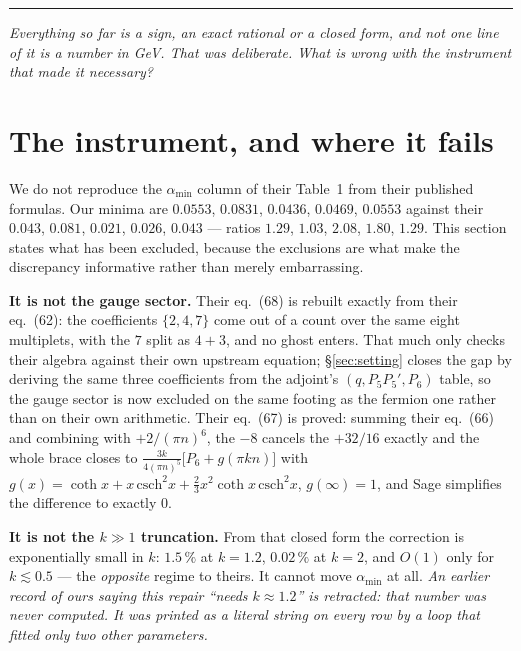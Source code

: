 \documentclass[11pt,a4paper]{article}
\newcommand{\amin}{\alpha_{\min}}
\newcommand{\bridge}[1]{\par\medskip\noindent
  \textcolor{hdrblue!45}{\rule{2.2cm}{0.6pt}}\;\;\parbox[t]{0.84\textwidth}{\small\itshape
  \textcolor{hdrblue!85}{#1}}\par\medskip}
\begin{document}
\bridge{Everything so far is a sign, an exact rational or a closed form, and not one line of it is a
number in GeV. That was deliberate. What is wrong with the instrument that made it necessary?}

\section{The instrument, and where it fails}\label{sec:instrument}

We do not reproduce the $\amin$ column of their Table~1 from their published formulas. Our minima
are $0.0553$, $0.0831$, $0.0436$, $0.0469$, $0.0553$ against their $0.043$, $0.081$, $0.021$,
$0.026$, $0.043$ --- ratios $1.29$, $1.03$, $2.08$, $1.80$, $1.29$. This section states what has
been excluded, because the exclusions are what make the discrepancy informative rather than merely
embarrassing.

\textbf{It is not the gauge sector.} Their eq.~(68) is rebuilt exactly from their eq.~(62): the
coefficients $\{2,4,7\}$ come out of a count over the same eight multiplets, with the $7$ split as
$4+3$, and no ghost enters. That much only checks their algebra against their own upstream
equation; \S\ref{sec:setting} closes the gap by deriving the same three coefficients from the
adjoint's $(q,P_5P_5',P_6)$ table, so the gauge sector is now excluded on the same footing as the
fermion one rather than on their own arithmetic. Their eq.~(67) is proved: summing their eq.~(66) and combining with
$+2/(\pi n)^6$, the $-8$ cancels the $+32/16$ exactly and the whole brace closes to
$\tfrac{3k}{4(\pi n)^5}\big[P_6+g(\pi kn)\big]$ with
$g(x)=\coth x+x\,\mathrm{csch}^2x+\tfrac23x^2\coth x\,\mathrm{csch}^2x$, $g(\infty)=1$, and Sage
simplifies the difference to exactly $0$.

\textbf{It is not the $k\gg1$ truncation.} From that closed form the correction is exponentially
small in $k$: $1.5\,\%$ at $k=1.2$, $0.02\,\%$ at $k=2$, and $O(1)$ only for $k\lesssim0.5$ --- the
\emph{opposite} regime to theirs. It cannot move $\amin$ at all. \emph{An earlier record of ours
saying this repair ``needs $k\approx1.2$'' is retracted: that number was never computed. It was
printed as a literal string on every row by a loop that fitted only two other parameters.}
\end{document}
